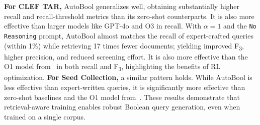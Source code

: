 \textbf{For CLEF TAR,} AutoBool generalizes well, obtaining substantially higher recall and recall-threshold metrics than its zero-shot counterparts. It is also more effective than larger models like GPT-4o and O3 in recall. With \(\alpha = 1\) and the \texttt{No Reasoning} prompt, AutoBool almost matches the recall of expert-crafted queries (within 1\%) while retrieving 17 times fewer documents; yielding improved F\textsubscript{3}, higher precision, and reduced screening effort. It is also more effective than the O1 model from~\citet{wang2025reassessing} in both recall and F\textsubscript{3}, highlighting the benefits of RL optimization.
\textbf{For Seed Collection,} a similar pattern holds. While AutoBool is less effective than expert-written queries, it is significantly more effective than zero-shot baselines and the O1 model from~\citet{wang2025reassessing}. These results demonstrate that retrieval-aware training enables robust Boolean query generation, even when trained on a single corpus.


